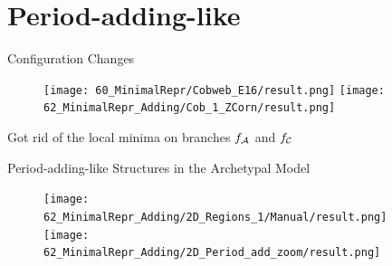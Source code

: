 \section{Period-adding-like}

\begin{frame}{Configuration Changes}
	\vspace{-1em}
	\begin{figure}
		\texttt{[image: 60\_MinimalRepr/Cobweb\_E16/result.png]}
		\quad
		\texttt{[image: 62\_MinimalRepr\_Adding/Cob\_1\_ZCorn/result.png]}
	\end{figure}
	\vspace{1em}
	Got rid of the local minima on branches $f_{\mathcal{A}}$ and $f_{\mathcal{C}}$
\end{frame}

\begin{frame}{Period-adding-like Structures in the Archetypal Model}
	\begin{figure}
		\texttt{[image: 62\_MinimalRepr\_Adding/2D\_Regions\_1/Manual/result.png]}
		\quad
		\texttt{[image: 62\_MinimalRepr\_Adding/2D\_Period\_add\_zoom/result.png]}
	\end{figure}
\end{frame}


